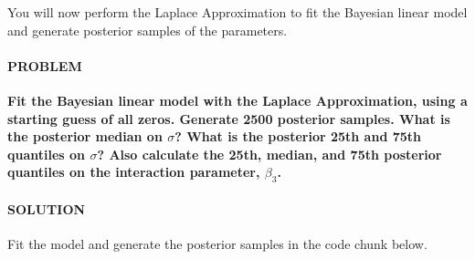 \documentclass[
]{article}
\newenvironment{Shaded}{\begin{snugshade}}{\end{snugshade}}
\newcommand{\CommentTok}[1]{\textcolor[rgb]{0.56,0.35,0.01}{\textit{#1}}}
\newcommand{\ControlFlowTok}[1]{\textcolor[rgb]{0.13,0.29,0.53}{\textbf{#1}}}
\newcommand{\DataTypeTok}[1]{\textcolor[rgb]{0.13,0.29,0.53}{#1}}
\newcommand{\DecValTok}[1]{\textcolor[rgb]{0.00,0.00,0.81}{#1}}
\newcommand{\KeywordTok}[1]{\textcolor[rgb]{0.13,0.29,0.53}{\textbf{#1}}}
\newcommand{\NormalTok}[1]{#1}
\newcommand{\OperatorTok}[1]{\textcolor[rgb]{0.81,0.36,0.00}{\textbf{#1}}}
\newcommand{\StringTok}[1]{\textcolor[rgb]{0.31,0.60,0.02}{#1}}
\begin{document}
\begin{Shaded}
\end{Shaded}

You will now perform the Laplace Approximation to fit the Bayesian
linear model and generate posterior samples of the parameters.

\hypertarget{problem-20}{%
\paragraph{PROBLEM}\label{problem-20}}

\textbf{Fit the Bayesian linear model with the Laplace Approximation,
using a starting guess of all zeros. Generate 2500 posterior samples.
What is the posterior median on \(\sigma\)? What is the posterior 25th
and 75th quantiles on \(\sigma\)? Also calculate the 25th, median, and
75th posterior quantiles on the interaction parameter, \(\beta_3\).}

\hypertarget{solution-19}{%
\paragraph{SOLUTION}\label{solution-19}}

Fit the model and generate the posterior samples in the code chunk
below.
\end{document}
